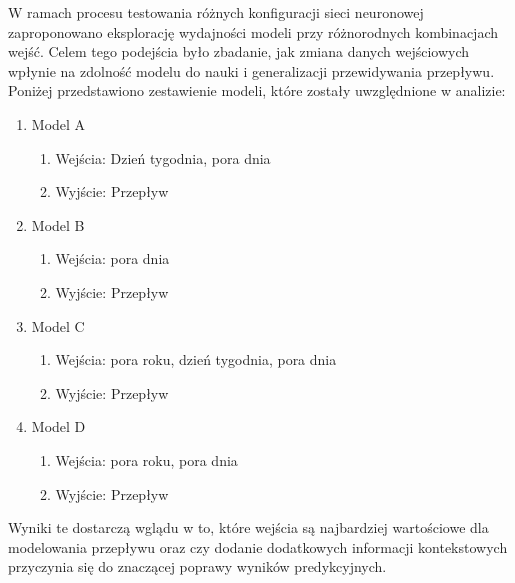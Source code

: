 \documentclass[a4paper,twoside,12pt]{book}
\begin{document}
W ramach procesu testowania różnych konfiguracji sieci neuronowej zaproponowano eksplorację wydajności modeli przy różnorodnych kombinacjach wejść. Celem tego podejścia było zbadanie, jak zmiana danych wejściowych wpłynie na zdolność modelu do nauki i generalizacji przewidywania przepływu. Poniżej przedstawiono zestawienie modeli, które zostały uwzględnione w analizie:

\begin{enumerate}
  \item Model A
        \begin{enumerate}
          \item Wejścia: Dzień tygodnia, pora dnia
          \item Wyjście: Przepływ
        \end{enumerate}
  \item Model B
        \begin{enumerate}
          \item Wejścia: pora dnia
          \item Wyjście: Przepływ
        \end{enumerate}
  \item Model C
        \begin{enumerate}
          \item Wejścia: pora roku, dzień tygodnia, pora dnia
          \item Wyjście: Przepływ
        \end{enumerate}
  \item Model D
        \begin{enumerate}
          \item Wejścia: pora roku, pora dnia
          \item Wyjście: Przepływ
        \end{enumerate}
\end{enumerate}

Wyniki te dostarczą wglądu w to, które wejścia są najbardziej wartościowe dla modelowania przepływu oraz czy dodanie dodatkowych informacji kontekstowych przyczynia się do znaczącej poprawy wyników predykcyjnych.\\
\end{document}
